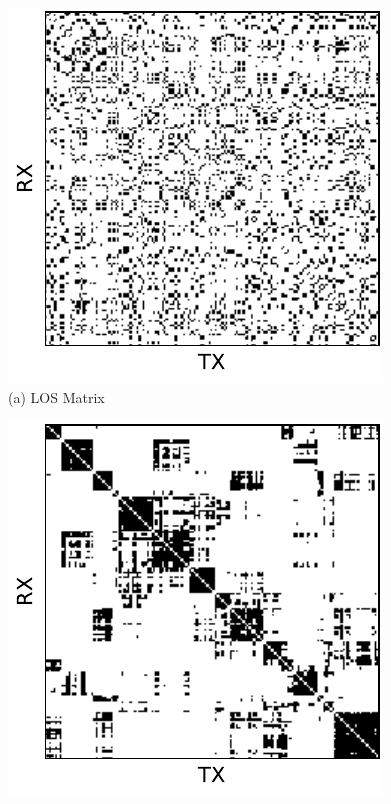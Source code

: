 \documentclass[conference]{IEEEtran}
\begin{document}
\begin{figure}[t!]
  \begin{minipage}[b]{0.32\linewidth}
    \begin{center}
      \includegraphics[width=\textwidth]{images/los_matrix.pdf} \\
      {\footnotesize(a) LOS Matrix}
    \end{center}
  \end{minipage}
  \begin{minipage}[b]{0.32\linewidth}
    \begin{center}
      \includegraphics[width=\textwidth]{images/sorted_matrix.pdf} \\

\end{center}
\end{minipage}
\end{figure}
\end{document}
